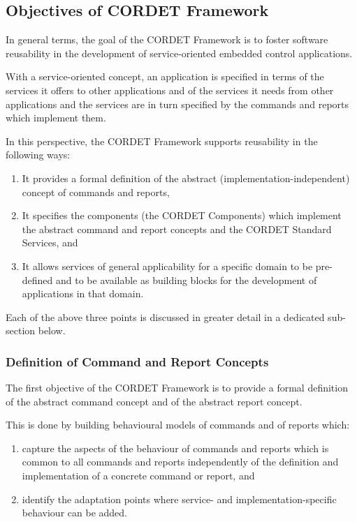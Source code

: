 \documentclass{pnp_article}
\begin{document}
\subsection{Objectives of CORDET Framework}\label{sec:ObjectivesOfCrFw} 

In general terms, the goal of the CORDET Framework is to foster software reusability in the development of service-oriented embedded control applications. 

With a service-oriented concept, an application is specified in terms of the services it offers to other applications and of the services it needs from other applications and the services are in turn specified by the commands and reports which implement them.

In this perspective, the CORDET Framework supports reusability in the following ways:

\begin{enumerate}
\item{} It provides a formal definition of the abstract (implementation-independent) concept of commands and reports,
\item{} It specifies the components (the CORDET Components) which implement the abstract command and report concepts and the CORDET Standard Services, and
\item{} It allows services of general applicability for a specific domain to be pre-defined and to be available as building blocks for the development of applications in that domain.
\end{enumerate}

Each of the above three points is discussed in greater detail in a dedicated sub-section below. 

\subsubsection{Definition of Command and Report Concepts}\label{sec:DefCmdRepConcepts}

The first objective of the CORDET Framework is to provide a formal definition of the abstract command concept and of the abstract report concept. 

This is done by building behavioural models of commands and of reports which:

\begin{enumerate}
\item{} capture the aspects of the behaviour of commands and reports which is common to all commands and reports independently of the definition and implementation of a concrete command or report, and
\item{} identify the adaptation points where service- and implementation-specific behaviour can be added.
\end{enumerate}
\end{document}
